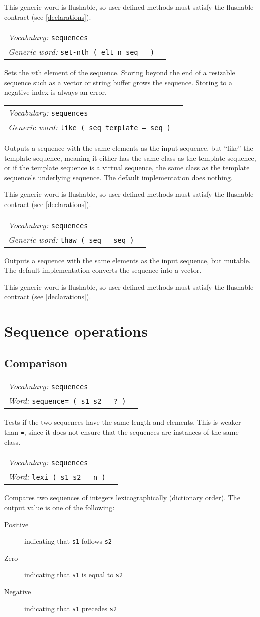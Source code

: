 \documentclass{book}
\newcommand{\vocabulary}[1]{\emph{Vocabulary:} \texttt{#1}&\\}
\newcommand{\ordinaryword}[2]{\index{\texttt{#1}}\emph{Word:} \texttt{#2}&\\}
\newcommand{\genericword}[2]{\index{\texttt{#1}}\emph{Generic word:} \texttt{#2}&\\}
\newcommand{\wordtable}[1]{


\begin{tabularx}{12cm}{lX}
\hline
#1
\hline
\end{tabularx}

}
\begin{document}
This generic word is flushable, so user-defined methods must satisfy the flushable contract (see \ref{declarations}).

\wordtable{
\vocabulary{sequences}
\genericword{set-nth}{set-nth ( elt n seq -- )}
}
Sets the $n$th element of the sequence. Storing beyond the end of a resizable sequence such as a vector or string buffer grows the sequence. Storing to a negative index is always an error.

\wordtable{
\vocabulary{sequences}
\genericword{like}{like ( seq template -- seq )}
}
Outputs a sequence with the same elements as the input sequence, but ``like'' the template sequence, meaning it either has the same class as the template sequence, or if the template sequence is a virtual sequence, the same class as the template sequence's underlying sequence. The default implementation does nothing.

This generic word is flushable, so user-defined methods must satisfy the flushable contract (see \ref{declarations}).

\wordtable{
\vocabulary{sequences}
\genericword{thaw}{thaw ( seq -- seq )}
}
Outputs a sequence with the same elements as the input sequence, but mutable. The default implementation converts the sequence into a vector.

This generic word is flushable, so user-defined methods must satisfy the flushable contract (see \ref{declarations}).

\section{Sequence operations}

\subsection{Comparison}

\wordtable{
\vocabulary{sequences}
\ordinaryword{sequence=}{sequence= ( s1 s2 -- ?~)}
}
Tests if the two sequences have the same length and elements. This is weaker than \texttt{=}, since it does not ensure that the sequences are instances of the same class.

\wordtable{
\vocabulary{sequences}
\ordinaryword{lexi}{lexi~( s1 s2 -- n )}

}
Compares two sequences of integers lexicographically (dictionary order). The output value is one of the following:
\begin{description}
\item[Positive] indicating that \texttt{s1} follows \texttt{s2}
\item[Zero] indicating that \texttt{s1} is equal to \texttt{s2}
\item[Negative] indicating that \texttt{s1} precedes \texttt{s2}
\end{description}
\end{document}
